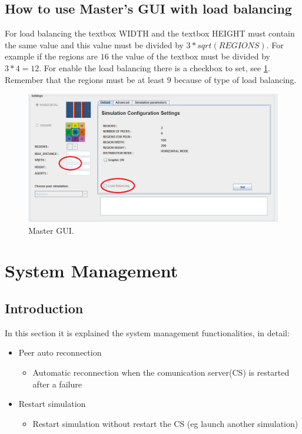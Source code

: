 \documentclass{article}
\begin{document}
\subsection{How to use Master’s GUI with load balancing}
For load balancing the textbox WIDTH and the textbox HEIGHT must contain the same value and this value must be divided by $3 * sqrt(REGIONS)$. For example if the regions are $16$  the value of the textbox must be divided by $3 * 4 = 12$.  For enable the load balancing there is a checkbox to set, see \ref{fig:masterlb}. Remember that the regions must be at least $9$ because of type of load balancing.
\begin{figure}
\centering
\includegraphics[width=1.3\textwidth, bb=0 0 1012 520]{JMasterUI.png}
\caption{Master GUI. \label{fig:masterlb}}
\end{figure}

\section{System Management}

\subsection{Introduction}
In this section it is explained the system management functionalities, in detail:

\begin{itemize}
	\item Peer auto reconnection
		\begin{itemize}
		\item Automatic reconnection when the comunication server(CS) is restarted after a failure 
		\end{itemize}
	 \item Restart simulation
		\begin{itemize}
		\item Restart simulation without restart the CS (eg launch another simulation) 
		\end{itemize}
\end{itemize}
\end{document}
